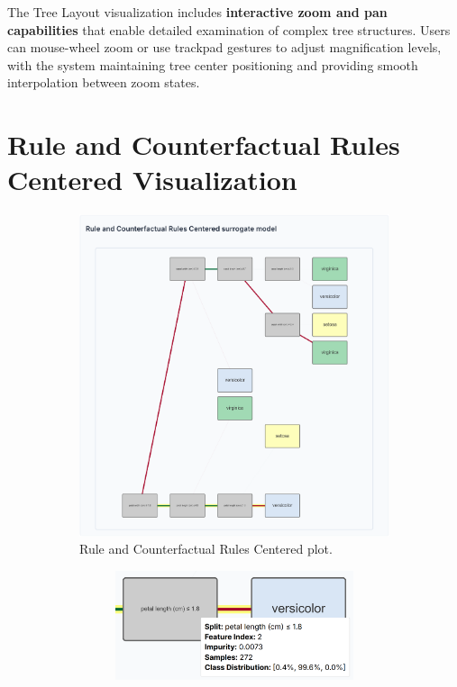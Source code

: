 The Tree Layout visualization includes \textbf{interactive zoom and pan capabilities} that enable detailed examination of complex tree structures. Users can mouse-wheel zoom or use trackpad gestures to adjust magnification levels, with the system maintaining tree center positioning and providing smooth interpolation between zoom states.

\section{Rule and Counterfactual Rules Centered Visualization}

\begin{figure}[ht!]
    \centering
    \begin{subfigure}[c]{0.68\textwidth}
        \centering
        \includegraphics[width=\linewidth]{images/blocksPlotFinal.png}
        \caption{Rule and Counterfactual Rules Centered plot.}
        \label{fig:blocksDecisionTreeFinal}
    \end{subfigure}%
    \hfill
    \begin{subfigure}[c]{0.28\textwidth}
        \centering
        \begin{subfigure}[c]{\linewidth}
            \centering
            \includegraphics[width=\linewidth]{images/blocksDecisionTreeFinalTooltipSplit.png}

\end{subfigure}
\end{subfigure}
\end{figure}
